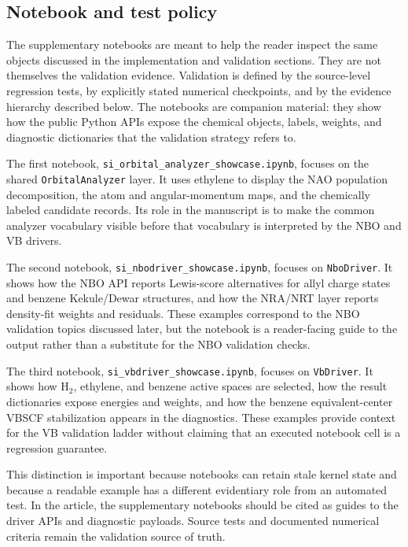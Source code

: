 \documentclass[11pt]{article}
\begin{document}
\subsection{Notebook and test policy}

The supplementary notebooks are meant to help the reader inspect the same objects discussed in the implementation and validation sections.  They are not themselves the validation evidence.  Validation is defined by the source-level regression tests, by explicitly stated numerical checkpoints, and by the evidence hierarchy described below.  The notebooks are companion material: they show how the public Python APIs expose the chemical objects, labels, weights, and diagnostic dictionaries that the validation strategy refers to.

The first notebook, \texttt{si\_orbital\_analyzer\_showcase.ipynb}, focuses on the shared \texttt{OrbitalAnalyzer} layer.  It uses ethylene to display the NAO population decomposition, the atom and angular-momentum maps, and the chemically labeled candidate records.  Its role in the manuscript is to make the common analyzer vocabulary visible before that vocabulary is interpreted by the NBO and VB drivers.

The second notebook, \texttt{si\_nbodriver\_showcase.ipynb}, focuses on \texttt{NboDriver}.  It shows how the NBO API reports Lewis-score alternatives for allyl charge states and benzene Kekule/Dewar structures, and how the NRA/NRT layer reports density-fit weights and residuals.  These examples correspond to the NBO validation topics discussed later, but the notebook is a reader-facing guide to the output rather than a substitute for the NBO validation checks.

The third notebook, \texttt{si\_vbdriver\_showcase.ipynb}, focuses on \texttt{VbDriver}.  It shows how H$_2$, ethylene, and benzene active spaces are selected, how the result dictionaries expose energies and weights, and how the benzene equivalent-center VBSCF stabilization appears in the diagnostics.  These examples provide context for the VB validation ladder without claiming that an executed notebook cell is a regression guarantee.

This distinction is important because notebooks can retain stale kernel state and because a readable example has a different evidentiary role from an automated test.  In the article, the supplementary notebooks should be cited as guides to the driver APIs and diagnostic payloads.  Source tests and documented numerical criteria remain the validation source of truth.
\end{document}
